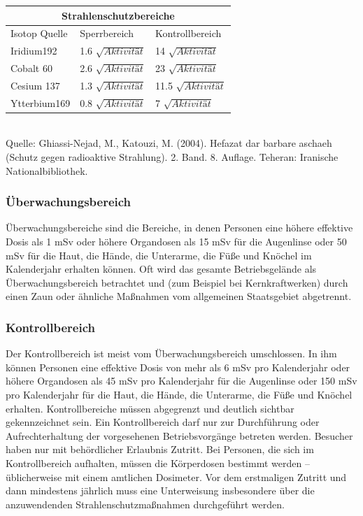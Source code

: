 {
\begin{tabular}{ |p{2.5cm}|p{4cm}|p{4cm}|  }
\hline
\multicolumn{3}{|c|}{Strahlenschutzbereiche} \\
\hline
Isotop Quelle& Sperrbereich &Kontrollbereich \\
\hline
Iridium192 &1.6 $\sqrt{Aktivität}$&14 $\sqrt{Aktivität}$\\
\hline
Cobalt 60&2.6 $\sqrt{Aktivität}$&23 $\sqrt{Aktivität}$ \\
\hline
Cesium 137&1.3 $\sqrt{Aktivität}$& 11.5 $\sqrt{Aktivität}$\\
\hline
Ytterbium169&0.8 $\sqrt{Aktivität}$&7 $\sqrt{Aktivität}$ \\
\hline
\end{tabular} \\
Quelle: Ghiassi-Nejad, M., Katouzi, M. (2004).
Hefazat dar barbare aschaeh (Schutz gegen radioaktive Strahlung). 2. Band. 8. Auflage.
Teheran: Iranische Nationalbibliothek.\\
\subsubsection{Überwachungsbereich}
Überwachungsbereiche sind die Bereiche, in denen Personen eine höhere effektive Dosis als 1 mSv oder höhere Organdosen als 15 mSv für die Augenlinse oder 50 mSv für die Haut, die Hände, die Unterarme, die Füße und Knöchel im Kalenderjahr erhalten können. Oft wird das gesamte Betriebsgelände als Überwachungsbereich betrachtet und (zum Beispiel bei Kernkraftwerken) durch einen Zaun oder ähnliche Maßnahmen vom allgemeinen Staatsgebiet abgetrennt.
\subsubsection{Kontrollbereich}
Der Kontrollbereich ist meist vom Überwachungsbereich umschlossen. In ihm können Personen eine effektive Dosis von mehr als 6 mSv pro Kalenderjahr oder höhere Organdosen als 45 mSv pro Kalenderjahr für die Augenlinse oder 150 mSv pro Kalenderjahr für die Haut, die Hände, die Unterarme, die Füße und Knöchel erhalten. Kontrollbereiche müssen abgegrenzt und deutlich sichtbar gekennzeichnet sein. Ein Kontrollbereich darf nur zur Durchführung oder Aufrechterhaltung der vorgesehenen Betriebsvorgänge betreten werden. Besucher haben nur mit behördlicher Erlaubnis Zutritt. Bei Personen, die sich im Kontrollbereich aufhalten, müssen die Körperdosen bestimmt werden – üblicherweise mit einem amtlichen Dosimeter. Vor dem erstmaligen Zutritt und dann mindestens jährlich muss eine Unterweisung insbesondere über die anzuwendenden Strahlenschutzmaßnahmen durchgeführt werden.

}
